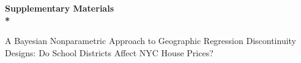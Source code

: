 \documentclass[aoas,preprint]{imsart}
\newcommand{\georddtitle}{
    A Bayesian Nonparametric Approach to Geographic Regression Discontinuity Designs:
    Do School Districts Affect NYC House Prices?
}
\begin{document}
\pagebreak
\begin{center}
    \bf 
    \LARGE
    Supplementary Materials
    \\*
    \large
    \georddtitle
\end{center}
\setcounter{equation}{0}
\setcounter{figure}{0}
\setcounter{table}{0}
\setcounter{section}{0}
\newcommand{\sprefix}{S-}
\renewcommand{\theequation}{\sprefix\arabic{equation}}
\renewcommand{\thesection}{\sprefix\arabic{section}}
\renewcommand{\thefigure}{\sprefix\arabic{figure}}
\renewcommand{\thetable}{\sprefix\arabic{table}}


\end{document}
